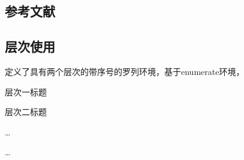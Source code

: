 \documentclass[twoside,maketable]{cauthesis}
\begin{document}
	\subsection{参考文献}
		\cite{王夫之1845--}\cite{KENNEDY1975-339-360}%
		\nocite{汪昂1881--}%

	\subsection{层次使用}
		定义了具有两个层次的带序号的罗列环境，基于enumerate环境，
		\begin{level}{1}
			\item 层次一标题
			\begin{level}{2}
				\item 层次二标题
				\item \ldots
			\end{level}
			\item \ldots
		\end{level}
\end{document}
